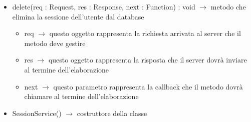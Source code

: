 \begin{description}
\begin{itemize}
	\item delete(req : Request, res : Response, next : Function) : void $\rightarrow$ metodo che elimina la sessione dell'utente dal database\begin{itemize}
		\item req $\rightarrow$ questo oggetto rappresenta la richiesta arrivata al server che il metodo deve gestire
		\item res $\rightarrow$ questo oggetto rappresenta la risposta che il server dovrà inviare al termine dell'elaborazione
		\item next $\rightarrow$ questo parametro rappresenta la callback che il metodo dovrà chiamare al termine dell’elaborazione
	\end{itemize}
	
	\item SessionService() $\rightarrow$ costruttore della classe
\end{itemize}

\end{description}

\vspace{0.5cm}
\hypertarget{server::service::RoleService}{}
